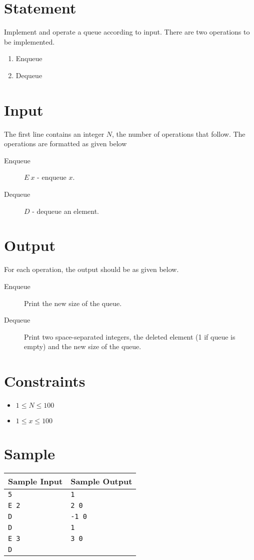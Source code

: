 \documentclass{article}
\begin{document}
\section*{Statement}

Implement and operate a queue according to input. There are two operations to be implemented.

\begin{enumerate}
    \item Enqueue
    \item Dequeue
\end{enumerate}

\section*{Input}

The first line contains an integer $N$, the number of operations that follow. The operations are formatted as given below

\begin{description}
    \item[Enqueue] $E\ x$ - enqueue $x$.
    \item[Dequeue] $D$ - dequeue an element.
\end{description}

\section*{Output}

For each operation, the output should be as given below.

\begin{description}
    \item[Enqueue] Print the new size of the queue.
    \item[Dequeue] Print two space-separated integers, the deleted element (1 if queue is empty) and the new size of the queue.
\end{description}

\section*{Constraints}

\begin{itemize}
    \item $1 \le N \le 100$
    \item $1 \le x \le 100$
\end{itemize}

\section*{Sample}

\begin{tabular}{l|l}
    \hline
    \hline
    Sample Input & Sample Output \\
    \hline
    \verb+5+ & \verb+1+ \\
    \verb+E 2+ & \verb+2 0+ \\
    \verb+D+ & \verb+-1 0+ \\
    \verb+D+ & \verb+1+ \\
    \verb+E 3+ & \verb+3 0+ \\
    \verb+D+ & \verb++ \\
    \hline
\end{tabular}
\end{document}
